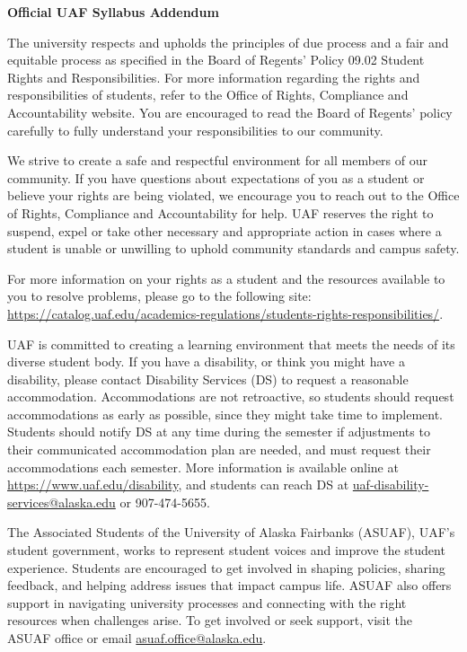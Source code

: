 \documentclass[12pt]{article}
\def\mailto#1{\href{mailto:#1}{#1}}
\begin{document}
\begin{center}
\textbf{\large{Official UAF Syllabus Addendum}}
\end{center}


 The university respects
and upholds the principles of due process and a fair and equitable
process as specified in the Board of Regents' Policy 09.02 Student
Rights and Responsibilities. For more information regarding the rights
and responsibilities of students, refer to the Office of Rights,
Compliance and Accountability website. You are encouraged to read the
Board of Regents' policy carefully to fully understand your
responsibilities to our community.

We strive to create a safe and respectful environment for all members
of our community. If you have questions about expectations of you as a
student or believe your rights are being violated, we encourage you to
reach out to the Office of Rights, Compliance and Accountability for
help. UAF reserves the right to suspend, expel or take other necessary
and appropriate action in cases where a student is unable or unwilling
to uphold community standards and campus safety.

For more information on your rights as a student and the resources
available to you to resolve problems, please go to the following
site:\\
\url{https://catalog.uaf.edu/academics-regulations/students-rights-responsibilities/}.

 UAF is committed to
creating a learning environment that meets the needs of its diverse
student body.  If you have a disability, or think you might have a
disability, please contact Disability Services (DS) to request a
reasonable accommodation.  Accommodations are not retroactive, so
students should request accommodations as early as possible, since
they might take time to implement.  Students should notify DS at any
time during the semester if adjustments to their communicated
accommodation plan are needed, and must request their accommodations
each semester.  More information is available online at
\url{https://www.uaf.edu/disability}, and students can reach DS at
\mailto{uaf-disability-services@alaska.edu} or 907-474-5655.

 The Associated Students
of the University of Alaska Fairbanks (ASUAF), UAF's student
government, works to represent student voices and improve the student
experience. Students are encouraged to get involved in shaping
policies, sharing feedback, and helping address issues that impact
campus life. ASUAF also offers support in navigating university
processes and connecting with the right resources when challenges
arise. To get involved or seek support, visit the ASUAF office or
email \mailto{asuaf.office@alaska.edu}.
\end{document}
